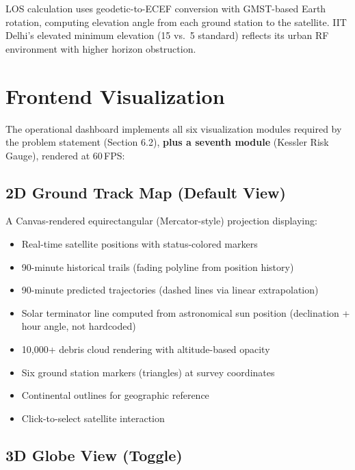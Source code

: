 \documentclass[11pt,a4paper]{article}
\begin{document}
LOS calculation uses geodetic-to-ECEF conversion with GMST-based Earth
rotation, computing elevation angle from each ground station to the satellite.
IIT Delhi's elevated minimum elevation (15\textdegree{} vs.\ 5\textdegree{}
standard) reflects its urban RF environment with higher horizon obstruction.

\section{Frontend Visualization}

The operational dashboard implements all six visualization modules required
by the problem statement (Section 6.2), \textbf{plus a seventh module}
(Kessler Risk Gauge), rendered at 60\,FPS:

\subsection{2D Ground Track Map (Default View)}

A Canvas-rendered equirectangular (Mercator-style) projection displaying:

\begin{itemize}[nosep]
  \item Real-time satellite positions with status-colored markers
  \item 90-minute historical trails (fading polyline from position history)
  \item 90-minute predicted trajectories (dashed lines via linear extrapolation)
  \item Solar terminator line computed from astronomical sun position
        (declination + hour angle, not hardcoded)
  \item 10,000+ debris cloud rendering with altitude-based opacity
  \item Six ground station markers (triangles) at survey coordinates
  \item Continental outlines for geographic reference
  \item Click-to-select satellite interaction
\end{itemize}

\subsection{3D Globe View (Toggle)}
\end{document}
